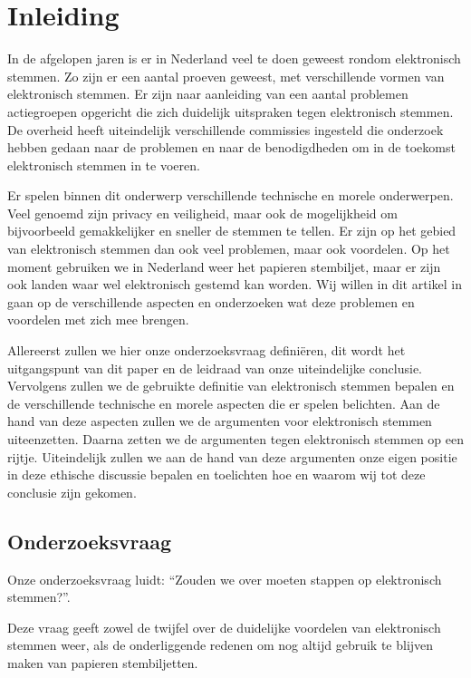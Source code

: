 \documentclass[a4paper]{article}
\begin{document}
\thispagestyle{plain}
\renewcommand{\contentsname}{Inhoud} 
\tableofcontents

\newpage

\section{Inleiding}

In de afgelopen jaren is er in Nederland veel te doen geweest rondom elektronisch stemmen.
Zo zijn er een aantal proeven geweest, met verschillende vormen van elektronisch stemmen.
Er zijn naar aanleiding van een aantal problemen actiegroepen opgericht die zich duidelijk uitspraken tegen elektronisch stemmen.
De overheid heeft uiteindelijk verschillende commissies ingesteld die onderzoek hebben gedaan naar de problemen en naar de benodigdheden om in de toekomst elektronisch stemmen in te voeren.

Er spelen binnen dit onderwerp verschillende technische en morele onderwerpen.
Veel genoemd zijn privacy en veiligheid, maar ook de mogelijkheid om bijvoorbeeld gemakkelijker en sneller de stemmen te tellen.
Er zijn op het gebied van elektronisch stemmen dan ook veel problemen, maar ook voordelen.
Op het moment gebruiken we in Nederland weer het papieren stembiljet, maar er zijn ook landen waar wel elektronisch gestemd kan worden.
Wij willen in dit artikel in gaan op de verschillende aspecten en onderzoeken wat deze problemen en voordelen met zich mee brengen.

Allereerst zullen we hier onze onderzoeksvraag definiëren, dit wordt het uitgangspunt van dit paper en de leidraad van onze uiteindelijke conclusie.
Vervolgens zullen we de gebruikte definitie van elektronisch stemmen bepalen en de verschillende technische en morele aspecten die er spelen belichten.
Aan de hand van deze aspecten zullen we de argumenten voor elektronisch stemmen uiteenzetten.
Daarna zetten we de argumenten tegen elektronisch stemmen op een rijtje.
Uiteindelijk zullen we aan de hand van deze argumenten onze eigen positie in deze ethische discussie bepalen en toelichten hoe en waarom wij tot deze conclusie zijn gekomen.

\subsection{Onderzoeksvraag}

Onze onderzoeksvraag luidt: ``Zouden we over moeten stappen op elektronisch stemmen?''.

Deze vraag geeft zowel de twijfel over de duidelijke voordelen van elektronisch stemmen weer, als de onderliggende redenen om nog altijd gebruik te blijven maken van papieren stembiljetten.
\end{document}
